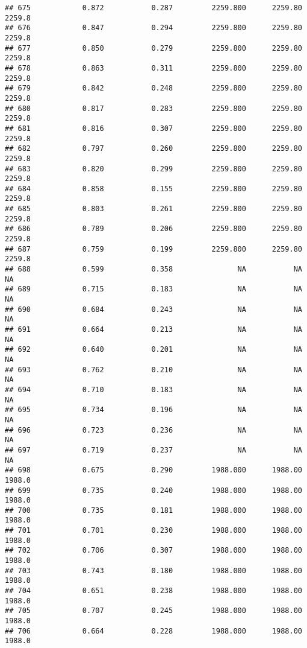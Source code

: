 \documentclass[
]{article}
\begin{document}
\begin{verbatim}
## 675            0.872           0.287         2259.800      2259.80       2259.8
## 676            0.847           0.294         2259.800      2259.80       2259.8
## 677            0.850           0.279         2259.800      2259.80       2259.8
## 678            0.863           0.311         2259.800      2259.80       2259.8
## 679            0.842           0.248         2259.800      2259.80       2259.8
## 680            0.817           0.283         2259.800      2259.80       2259.8
## 681            0.816           0.307         2259.800      2259.80       2259.8
## 682            0.797           0.260         2259.800      2259.80       2259.8
## 683            0.820           0.299         2259.800      2259.80       2259.8
## 684            0.858           0.155         2259.800      2259.80       2259.8
## 685            0.803           0.261         2259.800      2259.80       2259.8
## 686            0.789           0.206         2259.800      2259.80       2259.8
## 687            0.759           0.199         2259.800      2259.80       2259.8
## 688            0.599           0.358               NA           NA           NA
## 689            0.715           0.183               NA           NA           NA
## 690            0.684           0.243               NA           NA           NA
## 691            0.664           0.213               NA           NA           NA
## 692            0.640           0.201               NA           NA           NA
## 693            0.762           0.210               NA           NA           NA
## 694            0.710           0.183               NA           NA           NA
## 695            0.734           0.196               NA           NA           NA
## 696            0.723           0.236               NA           NA           NA
## 697            0.719           0.237               NA           NA           NA
## 698            0.675           0.290         1988.000      1988.00       1988.0
## 699            0.735           0.240         1988.000      1988.00       1988.0
## 700            0.735           0.181         1988.000      1988.00       1988.0
## 701            0.701           0.230         1988.000      1988.00       1988.0
## 702            0.706           0.307         1988.000      1988.00       1988.0
## 703            0.743           0.180         1988.000      1988.00       1988.0
## 704            0.651           0.238         1988.000      1988.00       1988.0
## 705            0.707           0.245         1988.000      1988.00       1988.0
## 706            0.664           0.228         1988.000      1988.00       1988.0

\end{verbatim}
\end{document}
